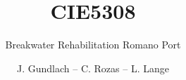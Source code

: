 \documentclass[whitelogo]{tudelft-report}
\begin{document}
\frontmatter


\title[tudelft-white]{CIE5308}
\subtitle[tudelft-black]{Breakwater Rehabilitation Romano Port}
\author[tudelft-white]{{J. Gundlach} -- {C. Rozas} -- {L. Lange}}
\makecover[split]




% 

\tableofcontents

\mainmatter

%









\appendix





\end{document}
